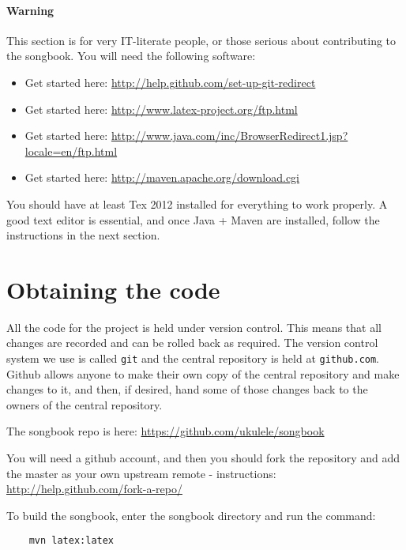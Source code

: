 \documentclass[16pt,a4paper,oneside]{book}
\newcommand{\latex}{\LaTeX\xspace}
\begin{document}
\paragraph{Warning} %
\label{par:warning}

This section is for very IT-literate people, or those serious about contributing to the songbook. You will need the following software:

\begin{itemize}
	\item[\textbf{Git}]Get started here: \url{http://help.github.com/set-up-git-redirect}
	\item[\textbf{\latex}]Get started here: \url{http://www.latex-project.org/ftp.html}
	\item[\textbf{Java}]Get started here: \url{http://www.java.com/inc/BrowserRedirect1.jsp?locale=en/ftp.html}
	\item[\textbf{Maven}]Get started here: \url{http://maven.apache.org/download.cgi}
\end{itemize}

You should have at least Tex 2012 installed for everything to work properly. A good text editor is essential, and once Java + Maven are installed, follow the instructions in the next section.

\section{Obtaining the code} %
\label{sec:obtaining_the_code}

All the code for the project is held under version control. This means that all changes are recorded and can be rolled back as required. The version control system we use is called \texttt{git} and the central repository is held at \texttt{github.com}. Github allows anyone to make their own copy of the central repository and make changes to it, and then, if desired, hand some of those changes back to the owners of the central repository.

The songbook repo is here: \url{https://github.com/ukulele/songbook}

You will need a github account, and then you should fork the repository and add the master as your own upstream remote - instructions: \url{http://help.github.com/fork-a-repo/}

To build the songbook, enter the songbook directory and run the command:

\begin{verbatim}
	mvn latex:latex
\end{verbatim}
\end{document}
